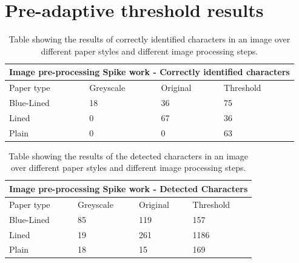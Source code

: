 \section{Pre-adaptive threshold results} \label{tesseract:spike_results}
\begin{table}[H]
\centering
\begin{tabular}{ ||p{3cm}||p{3cm}|p{3cm}|p{3cm}||  }
 \hline
 \multicolumn{4}{||c||}{Image pre-processing Spike work - Correctly identified characters} \\
 \hline
      Paper type & Greyscale & Original & Threshold\\
 \hline
  Blue-Lined & 18 &  36 & 75 \\
  Lined & 0 & 67 & 36   \\
  Plain & 0 & 0 & 63 \\
 \hline
\end{tabular}
\caption{Table showing the results of correctly identified characters in an image over different paper styles and different image processing steps.}
\label{table:pre-training}
\end{table}

\begin{table}[H]
\centering
\begin{tabular}{ ||p{3cm}||p{3cm}|p{3cm}|p{3cm}||  }
 \hline
 \multicolumn{4}{||c||}{Image pre-processing Spike work - Detected Characters} \\
 \hline
      Paper type & Greyscale & Original & Threshold\\
 \hline
  Blue-Lined &  85  & 119 &  157 \\
  Lined & 19 & 261 & 1186 \\
  Plain & 18 &  15 & 169 \\
 \hline
\end{tabular}
\caption{Table showing the results of the detected characters in an image over different paper styles and different image processing steps.}
\label{table:pre-training}
\end{table}
